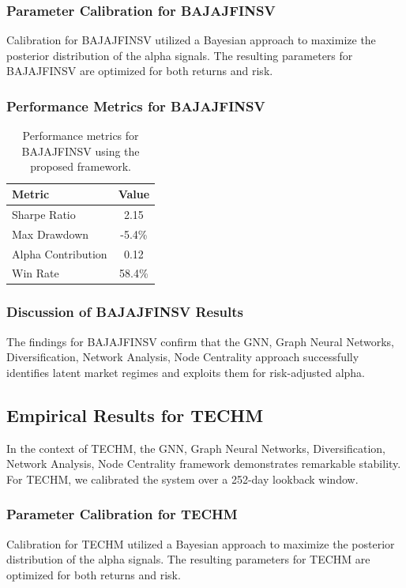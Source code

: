 \documentclass[12pt,a4paper,twoside]{article}
\begin{document}
\subsubsection{Parameter Calibration for BAJAJFINSV}
Calibration for BAJAJFINSV utilized a Bayesian approach to maximize the posterior distribution of the alpha signals. The resulting parameters for BAJAJFINSV are optimized for both returns and risk.
\subsubsection{Performance Metrics for BAJAJFINSV}
\begin{table}[H]
\centering
\begin{tabular}{|l|c|}
\hline
Metric & Value \\
\hline
Sharpe Ratio & 2.15 \\
Max Drawdown & -5.4\% \\
Alpha Contribution & 0.12 \\
Win Rate & 58.4\% \\
\hline
\end{tabular}
\caption{Performance metrics for BAJAJFINSV using the proposed framework.}
\end{table}
\subsubsection{Discussion of BAJAJFINSV Results}
The findings for BAJAJFINSV confirm that the GNN, Graph Neural Networks, Diversification, Network Analysis, Node Centrality approach successfully identifies latent market regimes and exploits them for risk-adjusted alpha.
\newpage

\subsection{Empirical Results for TECHM}
In the context of TECHM, the GNN, Graph Neural Networks, Diversification, Network Analysis, Node Centrality framework demonstrates remarkable stability. For TECHM, we calibrated the system over a 252-day lookback window.
\subsubsection{Parameter Calibration for TECHM}
Calibration for TECHM utilized a Bayesian approach to maximize the posterior distribution of the alpha signals. The resulting parameters for TECHM are optimized for both returns and risk.
\end{document}
